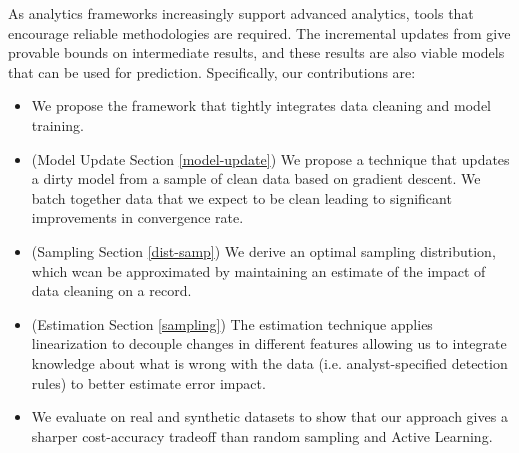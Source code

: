 As analytics frameworks increasingly support advanced analytics, tools that encourage reliable methodologies are required.
The incremental updates from \sys give provable bounds on intermediate results, and these results are also viable models that can be used for prediction. 
Specifically, our contributions are:
\begin{itemize}[noitemsep]
\item We propose the \sys framework that tightly integrates data cleaning and model training.
\item (Model Update Section \ref{model-update}) We propose a technique that updates a dirty model from a sample of clean data based on gradient descent. We batch together data that we expect to be clean leading to significant improvements in convergence rate.
\item (Sampling Section \ref{dist-samp}) We derive an optimal sampling distribution, which wcan be approximated by maintaining an estimate of the impact of data cleaning on a record. 
\item (Estimation Section \ref{sampling}) The estimation technique applies linearization to decouple changes in different features allowing us to integrate knowledge about what is wrong with the data (i.e. analyst-specified detection rules) to better estimate error impact.
\item We evaluate \sysfull on real and synthetic datasets to show that our approach gives a sharper cost-accuracy tradeoff than random sampling and Active Learning.
\end{itemize}






